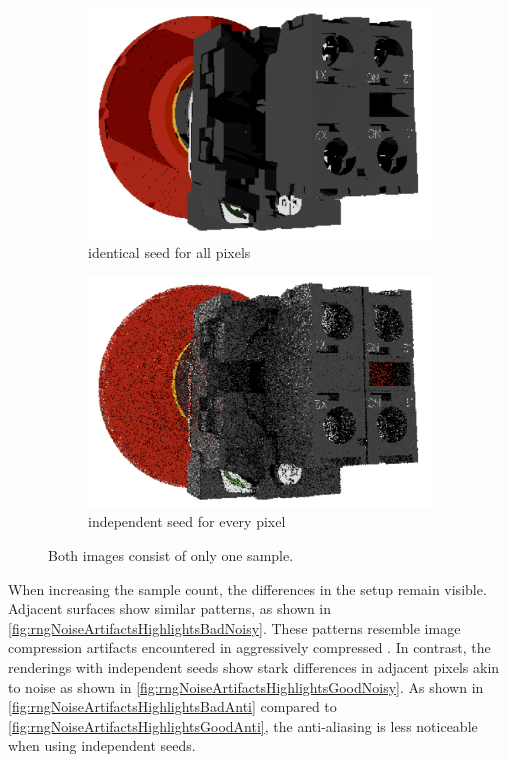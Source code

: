 \begin{figure}[H]
    \centering
    \begin{subfigure}[b]{0.45\textwidth}
        \includegraphics[width=\textwidth]{resources/single-sample-bad-seed.png}
        \caption{identical seed for all pixels}
        \label{fig:rngBadSeed}
    \end{subfigure}
    \hfill
    \begin{subfigure}[b]{0.45\textwidth}
        \includegraphics[width=\textwidth]{resources/single-sample-good-seed.png}
        \caption{independent seed for every pixel}
        \label{fig:rngGoodSeed}
    \end{subfigure}
    \caption{Both images consist of only one sample.}
    \label{fig:rngSeed}
\end{figure}

When increasing the sample count, the differences in the setup remain visible. Adjacent surfaces show similar patterns, as shown in \autoref{fig:rngNoiseArtifactsHighlightsBadNoisy}. These patterns resemble image compression artifacts encountered in aggressively compressed . In contrast, the renderings with independent seeds show stark differences in adjacent pixels akin to noise as shown in \autoref{fig:rngNoiseArtifactsHighlightsGoodNoisy}. As shown in \autoref{fig:rngNoiseArtifactsHighlightsBadAnti} compared to \autoref{fig:rngNoiseArtifactsHighlightsGoodAnti}, the anti-aliasing is less noticeable when using independent seeds.

